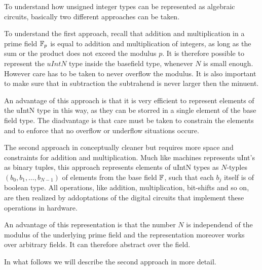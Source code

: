 To understand how unsigned integer types can be represented as algebraic circuits, basically two different approaches can be taken.

To understand the first approach, recall that addition and multiplication in a prime field $\mathbb{F}_p$ is equal to addition and multiplication of integers, as long as the sum or the product does not exceed the modulus $p$. It is therefore possible to represent the $uIntN$ type inside the basefield type, whenever $N$ is small enough. However care has to be taken to never overflow the modulus. It is also important to make sure that in subtraction the subtrahend is never larger then the minuent.

An advantage of this approach is that it is very efficient to represent elements of the uIntN type in this way, as they can be storred in a single element of the base field type. The diadvantage is that care must be taken to constrain the elements and to enforce that no overflow or underflow situations occure.

The second approach in conceptually cleaner but requires more space and constraints for addition and multiplication. Much like machines represents uInt's as binary tuples, this approach represents elements of uIntN types as $N$-typles $(b_0,b_1,\ldots, b_{N-1})$ of elements from the base field $\mathbb{F}$, such that each $b_j$ itself is of boolean type. All operations, like addition, multiplication, bit-shifts and so on, are then realized by addoptations of the digital circuits that implement these operations in hardware.

An advantage of this representation is that the number $N$ is independend of the modulus of the underlying prime field and the representation moreover works over arbitrary fields. It can therefore abstract over the field.


In what follows we will describe the second approach in more detail.


